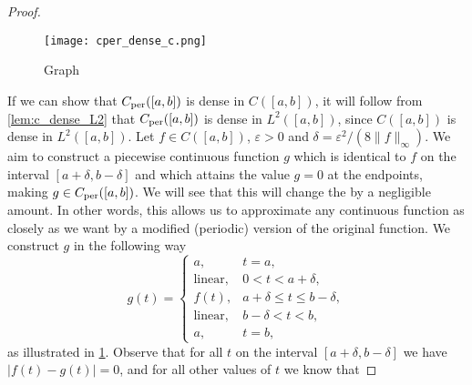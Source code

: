 \documentclass[../thesis.tex]{subfiles}
\begin{document}
\begin{proof}
    \begin{figure}
        \centering
        \texttt{[image: cper\_dense\_c.png]}
        \caption{Graph}
        \label{fig:g_periodic_close_to_f}
    \end{figure}
    
    If we can show that $C_{\text{per}}([a,b])$ is dense in $C([a,b])$, it will follow from \cref{lem:c_dense_L2} that $C_{\text{per}}([a,b])$ is dense in $L^2([a,b])$, since $C([a,b])$ is dense in $L^2([a,b])$. Let $f \in C([a,b])$, $\varepsilon>0$ and $\delta = \varepsilon^2/(8\|f\|_\infty)$. We aim to construct a piecewise continuous function $g$ which is identical to $f$ on the interval $[a+\delta,b-\delta ]$ and which attains the value $g = 0$ at the endpoints, making $g\in C_{\text{per}}([a,b])$. We will see that this will change the \Ltwonorm \space by a negligible amount. In other words, this allows us to approximate any continuous function as closely as we want by a modified (periodic) version of the original function. We construct $g$ in the following way  %
    \begin{equation*} %
        g(t) = 
        \begin{cases} a, &  t=a,\\  
            \text{linear}, &  0<t<a+\delta,\\ 
            f(t), & a+\delta \leq t \leq b-\delta,\\ 
            \text{linear}, &  b-\delta <t<b,\\ 
            a, &  t=b,
        \end{cases}
    \end{equation*} 
    as illustrated in \cref{fig:g_periodic_close_to_f}. Observe that for all $t$ on the interval $[a+\delta, b-\delta]$ we have $|f(t)-g(t)|= 0$, and for all other values of $t$ we know that

\end{proof}
\end{document}
